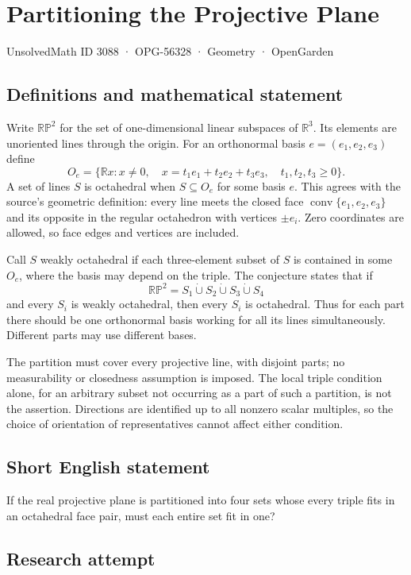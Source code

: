 \documentclass[11pt,a4paper]{article}
\begin{document}
\section*{Partitioning the Projective Plane}\label{3088}
{\small UnsolvedMath ID 3088 · OPG-56328 · Geometry · OpenGarden}
\subsection{Definitions and mathematical statement}
Write $\mathbb{RP}^2$ for the set of one-dimensional linear subspaces of
$\mathbb R^3$. Its elements are unoriented lines through the origin.
For an orthonormal basis $e=(e_1,e_2,e_3)$ define
\[
 O_e=\{\mathbb R x:x\ne0,\quad
                x=t_1e_1+t_2e_2+t_3e_3,\quad t_1,t_2,t_3\ge0\}.
\]
A set of lines $S$ is octahedral when $S\subseteq O_e$ for some basis $e$.
This agrees with the source's geometric definition: every line meets
the closed face $\operatorname{conv}\{e_1,e_2,e_3\}$ and its opposite in
the regular octahedron with vertices $\pm e_i$. Zero coordinates are allowed,
so face edges and vertices are included.

Call $S$ weakly octahedral if each three-element subset of $S$ is
contained in some $O_e$, where the basis may depend on the triple.
The conjecture states that if
\[
 \mathbb{RP}^2=S_1\mathbin{\dot\cup}S_2\mathbin{\dot\cup}S_3
                         \mathbin{\dot\cup}S_4
\]
and every $S_i$ is weakly octahedral, then every $S_i$ is octahedral.
Thus for each part there should be one orthonormal basis working for
all its lines simultaneously. Different parts may use different bases.

The partition must cover every projective line, with disjoint parts;
no measurability or closedness assumption is imposed. The local triple
condition alone, for an arbitrary subset not occurring as a part of such
a partition, is not the assertion. Directions are identified up to all
nonzero scalar multiples, so the choice of orientation of representatives
cannot affect either condition.
\subsection{Short English statement}
If the real projective plane is partitioned into four sets whose every triple fits in an octahedral face pair, must each entire set fit in one?
\subsection{Research attempt}
\end{document}
